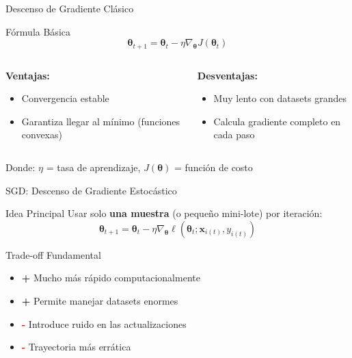 \documentclass[10pt]{beamer}
\begin{document}
\begin{frame}{Descenso de Gradiente Clásico}
\begin{block}{Fórmula Básica}
$$\boldsymbol{\theta}_{t+1} = \boldsymbol{\theta}_t - \eta \nabla_{\boldsymbol{\theta}} J(\boldsymbol{\theta}_t)$$
\end{block}

\begin{columns}
\begin{column}{0.5\textwidth}
\textbf{Ventajas:}
\begin{itemize}
\item Convergencia estable
\item Garantiza llegar al mínimo (funciones convexas)
\end{itemize}
\end{column}
\begin{column}{0.5\textwidth}
\textbf{Desventajas:}
\begin{itemize}
\item Muy lento con datasets grandes
\item Calcula gradiente completo en cada paso
\end{itemize}
\end{column}
\end{columns}

\vspace{0.5cm}
Donde: $\eta$ = tasa de aprendizaje, $J(\boldsymbol{\theta})$ = función de costo
\end{frame}

\begin{frame}{SGD: Descenso de Gradiente Estocástico}
\begin{block}{Idea Principal}
Usar solo \textbf{una muestra} (o pequeño mini-lote) por iteración:
$$\boldsymbol{\theta}_{t+1} = \boldsymbol{\theta}_t - \eta \nabla_{\boldsymbol{\theta}} \ell(\boldsymbol{\theta}_t; \mathbf{x}_{i(t)}, y_{i(t)})$$
\end{block}

\begin{alertblock}{Trade-off Fundamental}
\begin{itemize}
\item \textcolor{verdeClaro}{\textbf{+}} Mucho más rápido computacionalmente
\item \textcolor{verdeClaro}{\textbf{+}} Permite manejar datasets enormes
\item \textcolor{red}{\textbf{-}} Introduce ruido en las actualizaciones
\item \textcolor{red}{\textbf{-}} Trayectoria más errática
\end{itemize}
\end{alertblock}
\end{frame}
\end{document}
